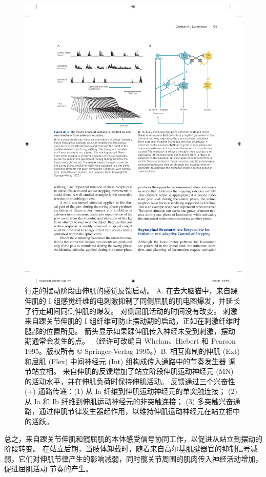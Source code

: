 \begin{figure}[htbp]
	\centering
	\includegraphics[width=0.9\linewidth]{chap33/fig_33_9}
	\caption{行走的摆动阶段由伸肌的感觉反馈启动。 A. 在去大脑猫中，来自踝伸肌的 I 组感觉纤维的电刺激抑制了同侧屈肌的肌电图爆发，并延长了行走期间同侧伸肌的爆发。 对侧屈肌活动的时间没有改变。 刺激来自踝关节伸肌的 I 组纤维可防止摆动期的启动，正如在刺激纤维时腿部的位置所见。 箭头显示如果踝伸肌传入神经未受到刺激，摆动期通常会发生的点。 （经许可改编自 Whelan、Hiebert 和 Pearson 1995。版权所有 © Springer-Verlag 1995。）B. 相互抑制的伸肌 (Ext) 和屈肌 (Flex) 中间神经元 (Int) 组构成传入通路中的节奏发生器 调节站立相。 来自伸肌的反馈增加了站立阶段伸肌运动神经元 (MN) 的活动水平，并在伸肌负荷时保持伸肌活动。 反馈通过三个兴奋性 (+) 通路传递：(1) 从 Ia 纤维到伸肌运动神经元的单突触连接； (2) 从 Ia 和 Ib 纤维到伸肌运动神经元的非突触连接； (3) 多突触兴奋通路，通过伸肌节律发生器起作用，以维持伸肌运动神经元在站立相中的活跃。}
	\label{fig:33_9}
\end{figure}

总之，来自踝关节伸肌和髋屈肌的本体感受信号协同工作，以促进从站立到摆动的阶段转变。 在站立后期，当肢体卸载时，随着来自高尔基肌腱器官的抑制信号减弱，它们对伸肌节律产生的影响减弱，同时髋关节周围的肌肉传入神经活动增加，促进屈肌活动 节奏的产生。

